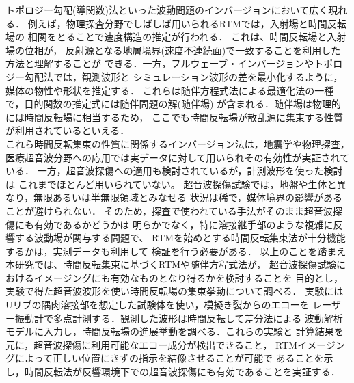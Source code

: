 トポロジー勾配(導関数)法といった波動問題のインバージョンにおいて広く現れる．
例えば，物理探査分野でしばしば用いられるRTMでは，入射場と時間反転場の
相関をとることで速度構造の推定が行われる． これは、時間反転場と入射場の位相が，
反射源となる地層境界(速度不連続面)で一致することを利用した方法と理解することが
できる．一方，フルウェーブ・インバージョンやトポロジー勾配法では，観測波形と
シミュレーション波形の差を最小化するように，媒体の物性や形状を推定する．
これらは随伴方程式法による最適化法の一種で，目的関数の推定式には随伴問題の解(随伴場)
が含まれる．随伴場は物理的には時間反転場に相当するため，
ここでも時間反転場が散乱源に集束する性質が利用されているといえる．
\\
\hspace{\parindent}
これら時間反転集束の性質に関係するインバージョン法は，地震学や物理探査，
医療超音波分野への応用では実データに対して用いられその有効性が実証されている．
一方，超音波探傷への適用も検討されているが，計測波形を使った検討は
これまでほとんど用いられていない。 
超音波探傷試験では，地盤や生体と異なり，無限あるいは半無限領域とみなせる
状況は稀で，媒体境界の影響があることが避けられない．
そのため，探査で使われている手法がそのまま超音波探傷にも有効であるかどうかは
明らかでなく，特に溶接継手部のような複雑に反響する波動場が関与する問題で、
RTMを始めとする時間反転集束法が十分機能するかは，実測データも利用して
検証を行う必要がある．
%
以上のことを踏まえ本研究では、時間反転集束に基づくRTMや随伴方程式法が，
超音波探傷試験におけるイメージングにも有効なものとなり得るかを検討することを
目的とし，実験で得た超音波波形を使い時間反転場の集束挙動について調べる．
実験にはUリブの隅肉溶接部を想定した試験体を使い，模擬き裂からのエコーを
レーザー振動計で多点計測する．観測した波形は時間反転して差分法による
波動解析モデルに入力し，時間反転場の進展挙動を調べる．これらの実験と
計算結果を元に，超音波探傷に利用可能なエコー成分が検出できること，
RTMイメージングによって正しい位置にきずの指示を結像させることが可能で
あることを示し，時間反転法が反響環境下での超音波探傷にも有効であることを実証する．
